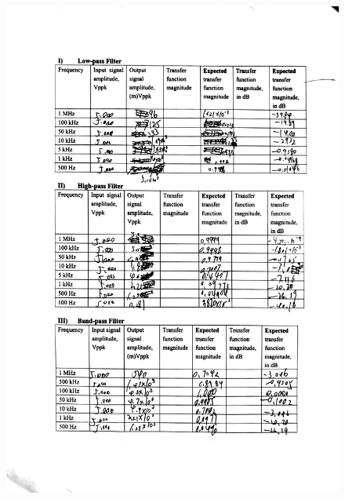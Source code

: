 \documentclass[a4paper]{report}
\begin{document}
\begin{figure}[H]
	\centering
	\includegraphics[width=1\linewidth]{14.jpg}
\end{figure}
\end{document}
